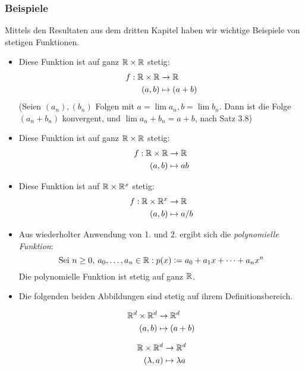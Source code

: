 \subsubsection*{Beispiele}
Mittels den Resultaten aus dem dritten Kapitel haben wir wichtige Beispiele von stetigen Funktionen.
\begin{itemize}
\item Diese Funktion ist auf ganz $\mathbb{R}\times\mathbb{R}$ stetig: \begin{align*}f:\mathbb{R}\times\mathbb{R}&\to\mathbb{R} \\ (a,b) &\mapsto (a+b) \end{align*} (Seien $(a_{n}), (b_{n})$ Folgen mit $a = \lim{a_{n}}, b = \lim{b_{n}}$. Dann ist die Folge $(a_{n} + b_{n})$ konvergent, und $\lim{a_{n}+b_{n}} = a + b$, nach Satz 3.8)
\item Diese Funktion ist auf ganz $\mathbb{R}\times\mathbb{R}$ stetig:
\begin{align*}f:\mathbb{R}\times\mathbb{R}&\to\mathbb{R} \\ (a,b)&\mapsto ab \end{align*}
\item Diese Funktion ist auf $\mathbb{R}\times\mathbb{R}^{x}$ stetig:
\begin{align*}f:\mathbb{R}\times\mathbb{R}^{x}&\to\mathbb{R} \\ (a,b)&\mapsto a/b \end{align*}
\item Aus wiederholter Anwendung von 1. und 2. ergibt sich die \emph{polynomielle Funktion}:
\[\text{Sei } n \geq 0,\: a_{0}, \dots, a_{n}\in\mathbb{R}: p(x)\vcentcolon= a_{0} + a_{1}x + \dots + a_{n}x^{n} \]
Die polynomielle Funktion ist stetig auf ganz $\mathbb{R}$.
\item Die folgenden beiden Abbildungen sind stetig auf ihrem Definitionsbereich.
\begin{figure}[htbp]
\begin{minipage}[t][4mm][b]{0.5\textwidth}
\begin{align*} \mathbb{R}^{d}\times\mathbb{R}^{d}&\to\mathbb{R}^{d} \\ (a,b)&\mapsto(a+b)\end{align*}
\end{minipage}
\begin{minipage}[t][4mm][b]{0.5\textwidth}
\begin{align*}  \mathbb{R}\times\mathbb{R}^{d}&\to\mathbb{R}^{d} \\ (\lambda,a)&\mapsto\lambda a \end{align*}
\end{minipage}
\end{figure}


\end{itemize}
